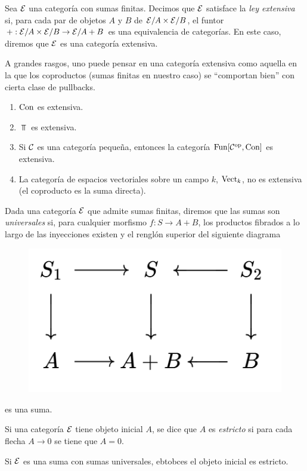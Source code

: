 \begin{definition}
    Sea ${\mathcal E}$ una categoría con sumas finitas. Decimos que ${\mathcal E}$ satisface la \emph{ley extensiva} si, para cada par de objetos $A$ y $B$ de ${\mathcal E}/A\times {\mathcal E}/B$, el funtor $+:{\mathcal E}/A\times{\mathcal E}/B\to{\mathcal E}/A+B$ es una equivalencia de categorías. En este caso, diremos que ${\mathcal E}$ es una categoría extensiva. 
\end{definition}
A grandes rasgos, uno puede pensar en una categoría extensiva como aquella en la que los coproductos (sumas finitas en nuestro caso) se ``comportan bien'' con cierta clase de pullbacks. 
\begin{ejp}
\text{}
    \begin{enumerate}
        \item ${\mathrm{Con}}$ es extensiva.
        \item $\Top$ es extensiva.
        \item Si ${\mathcal C}$ es una categoría pequeña, entonces la categoría $\mathrm{Fun}[{\mathcal C}^{\mathrm{op}},{\mathrm{Con}}]$ es extensiva.
        \item La categoría de espacios vectoriales sobre un campo $k$, ${\mathrm{Vect}}_k$, no es extensiva (el coproducto es la suma directa).
    \end{enumerate}
\end{ejp}
\begin{definition}
    Dada una categoría ${\mathcal E}$ que admite sumas finitas, diremos que las sumas son \emph{universales} si, para cualquier morfismo $f:S\to A+B$, los productos fibrados a lo largo de las inyecciones existen y el renglón superior del siguiente diagrama
        \begin{figure}[H]
        \centering
        \includegraphics[width=0.3\linewidth]{img/diagrama1.5.3.png}
    \end{figure}
    es una suma. 
\end{definition}
\begin{definition}
    Si una categoría ${\mathcal E}$ tiene objeto inicial $A$, se dice que $A$ es \emph{estricto} si para cada flecha $A\to 0$ se tiene que $A=0$. 
\end{definition}
\begin{lema}
    Si ${\mathcal E}$ es una suma con sumas universales, ebtobces el objeto inicial es estricto.
\end{lema}
